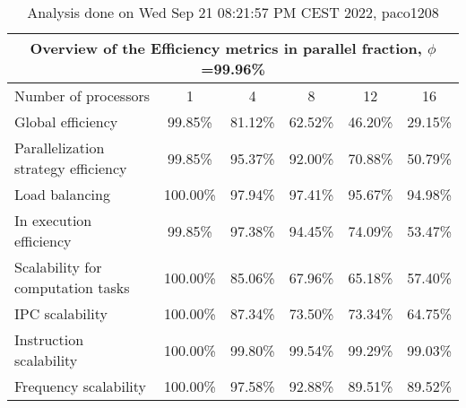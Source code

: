 \begin{table}[h]
\begin{center}
\begin{tabular}{|l|c|c|c|c|c|}
\hline
\multicolumn{6}{|c|}{Overview of the Efficiency metrics in parallel fraction, $\phi$=99.96\%} \\
\hline
\hline
Number of processors & 1 & 4 & 8 & 12 & 16 \\
\hline
\hline
Global efficiency                      &     99.85\% &     81.12\% &     62.52\% &     46.20\% &     29.15\% \\
\hline
\hline
Parallelization strategy efficiency &     99.85\% &     95.37\% &     92.00\% &     70.88\% &     50.79\% \\
\hline
Load balancing                   &    100.00\% &     97.94\% &     97.41\% &     95.67\% &     94.98\% \\
In execution efficiency          &     99.85\% &     97.38\% &     94.45\% &     74.09\% &     53.47\% \\
\hline
\hline
Scalability for computation tasks   &    100.00\% &     85.06\% &     67.96\% &     65.18\% &     57.40\% \\
\hline
IPC scalability                  &    100.00\% &     87.34\% &     73.50\% &     73.34\% &     64.75\% \\
Instruction scalability          &    100.00\% &     99.80\% &     99.54\% &     99.29\% &     99.03\% \\
Frequency scalability            &    100.00\% &     97.58\% &     92.88\% &     89.51\% &     89.52\% \\
\hline
\end{tabular}
\end{center}
\caption{ Analysis done on Wed Sep 21 08:21:57 PM CEST 2022, paco1208}
\end{table}
